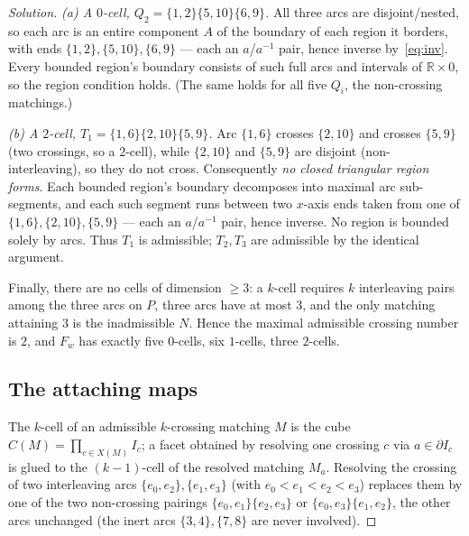 \documentclass{amsart}
\theoremstyle{definition}
\newcommand{\RR}{\mathbb{R}}
\newcommand{\bdy}{\partial}
\begin{document}
\begin{proof}[Solution]
\emph{(a) A $0$-cell, $Q_2=\{1,2\}\{5,10\}\{6,9\}$.} All three arcs are disjoint/nested, so
each arc is an entire component $A$ of the boundary of each region it borders, with ends
$\{1,2\},\{5,10\},\{6,9\}$ --- each an $a$/$a^{-1}$ pair, hence inverse by~\eqref{eq:inv}. Every
bounded region's boundary consists of such full arcs and intervals of $\RR\times0$, so the
region condition holds. (The same holds for all five $Q_i$, the non-crossing matchings.)

\emph{(b) A $2$-cell, $T_1=\{1,6\}\{2,10\}\{5,9\}$.} Arc $\{1,6\}$ crosses $\{2,10\}$ and
crosses $\{5,9\}$ (two crossings, so a $2$-cell), while $\{2,10\}$ and $\{5,9\}$ are disjoint
(non-interleaving), so they do not cross. Consequently \emph{no closed triangular region
forms}. Each bounded region's boundary decomposes into maximal arc sub-segments, and each such
segment runs between two $x$-axis ends taken from one of $\{1,6\},\{2,10\},\{5,9\}$ --- each an
$a$/$a^{-1}$ pair, hence inverse. No region is bounded solely by arcs. Thus $T_1$ is
admissible; $T_2,T_3$ are admissible by the identical argument.

Finally, there are no cells of dimension $\ge 3$: a $k$-cell requires $k$ interleaving pairs
among the three arcs on $P$, three arcs have at most $3$, and the only matching attaining $3$
is the inadmissible $N$. Hence the maximal admissible crossing number is $2$, and $F_w$ has
exactly five $0$-cells, six $1$-cells, three $2$-cells.

\subsection{The attaching maps}\label{sec:attach}

The $k$-cell of an admissible $k$-crossing matching $M$ is the cube
$C(M)=\prod_{c\in X(M)}I_c$; a facet obtained by resolving one crossing $c$ via $a\in\bdy I_c$
is glued to the $(k-1)$-cell of the resolved matching $M_a$. Resolving the crossing of two
interleaving arcs $\{e_0,e_2\},\{e_1,e_3\}$ (with $e_0<e_1<e_2<e_3$) replaces them by one of
the two non-crossing pairings $\{e_0,e_1\}\{e_2,e_3\}$ or $\{e_0,e_3\}\{e_1,e_2\}$, the other
arcs unchanged (the inert arcs $\{3,4\},\{7,8\}$ are never involved).


\end{proof}
\end{document}
